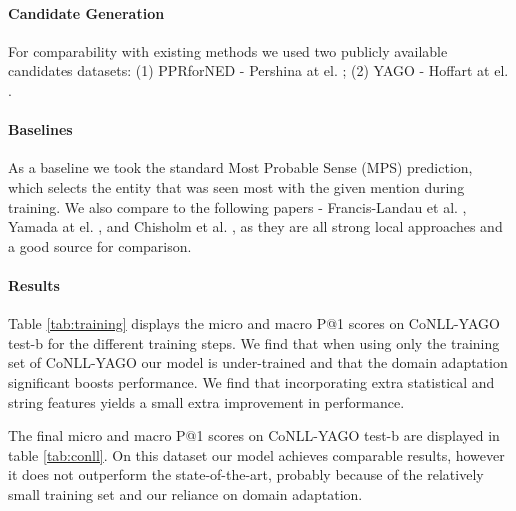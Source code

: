 \documentclass[11pt,a4paper]{article}
\begin{document}
	\paragraph{Candidate Generation}
	For comparability with existing methods we used two publicly available candidates datasets: (1) PPRforNED - Pershina at el. ;
	(2) YAGO - Hoffart at el. .
	
	\paragraph{Baselines}
	As a baseline we took the standard Most Probable Sense (MPS) prediction, which selects the entity that was seen most with the given mention during training.
	We also compare to the following papers - Francis-Landau et al. ,  Yamada at el. , and Chisholm et al. , as they are all strong local approaches and a good source for comparison.
	
	
	\paragraph{Results}
	Table \ref{tab:training} displays the micro and macro P@1 scores on CoNLL-YAGO test-b for the different training steps. We find that when using only the training set of CoNLL-YAGO our model is under-trained and that the domain adaptation significant boosts performance. We find that incorporating extra statistical and string features yields a small extra improvement in performance.
	
	The final micro and macro P@1 scores on CoNLL-YAGO test-b are displayed in table \ref{tab:conll}. On this dataset our model achieves comparable results, however it does not outperform the state-of-the-art, probably because of the relatively small training set and our reliance on domain adaptation.
	
\end{document}

